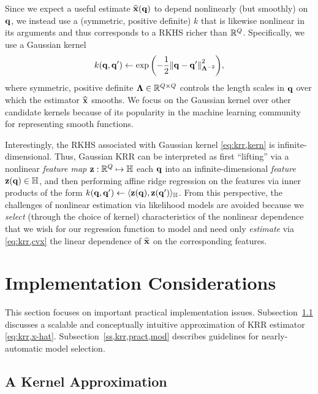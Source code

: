 Since we expect a useful estimate $\est{\bmx}\paren{\bmq}$ 
to depend nonlinearly (but smoothly) on $\mathbf{q}$,
we instead use a 
(symmetric, positive definite) 
$k$ that is likewise nonlinear in its arguments
and thus corresponds to a RKHS richer than $\mathbb{R}^{Q}$. 
Specifically, we use a Gaussian kernel
\begin{align}
	k(\bmq,\bmq') \gets \expa{-\frac{1}{2}\norm{\bmq-\bmq'}^2_{\bmL^{-2}}},
	\label{eq:krr,kern}
\end{align}
where symmetric, positive definite 
$\boldsymbol{\Lambda} \in \mathbb{R}^{Q \times Q}$ 
controls the length scales in $\mathbf{q}$ over which 
the estimator $\widehat{\mathbf{x}}$ smooths.
We focus on the Gaussian kernel
over other candidate kernels
because of its popularity
in the machine learning community 
for representing smooth functions.

Interestingly, 
the RKHS associated 
with Gaussian kernel \eqref{eq:krr,kern}
is infinite-dimensional.
Thus, 
Gaussian KRR
can be interpreted as 
first ``lifting'' 
via a nonlinear \emph{feature map} 
$\mathbf{z} : \mathbb{R}^{Q} \mapsto \mathbb{H}$ 
each $\mathbf{q}$ 
into an infinite-dimensional \emph{feature} $\bmza{\bmq} \in \hilb$,
and then performing affine ridge regression
on the features
via inner products of the form
$k(\bmq,\bmq') \gets \innprod{\bmza{\bmq}}{\bmza{\bmq'}}_{\hilb}$.
From this perspective,
the challenges of nonlinear estimation 
via likelihood models
are avoided 
because we \emph{select} 
(through the choice of kernel) 
characteristics of the nonlinear dependence
that we wish 
for our regression function to model
and need only \emph{estimate} via \eqref{eq:krr,cvx} 
the linear dependence
of $\widehat{\mathbf{x}}$ on the corresponding features.

\section{Implementation Considerations}
\label{s,krr,pract,apprx}

This section focuses
on important practical implementation issues.
Subsection~\ref{ss,krr,pract,apprx} discusses
a scalable and conceptually intuitive approximation
of KRR estimator \eqref{eq:krr,x-hat}.
Subsection~\ref{ss,krr,pract,mod} describes guidelines
for nearly-automatic model selection.

\subsection{A Kernel Approximation}
\label{ss,krr,pract,apprx}

